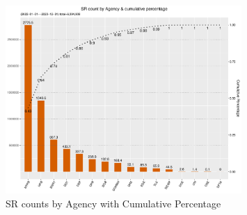 \documentclass[linenumber]{jdsart}
\begin{document}
\begin{figure}[tbp]
	\centering
	\includegraphics[width=0.8\textwidth]{SRs_by_Agency.pdf}
  	\caption{SR counts by Agency with Cumulative Percentage}
	\label{fig:SRcountbyAgency}
\end{figure}

\end{document}
